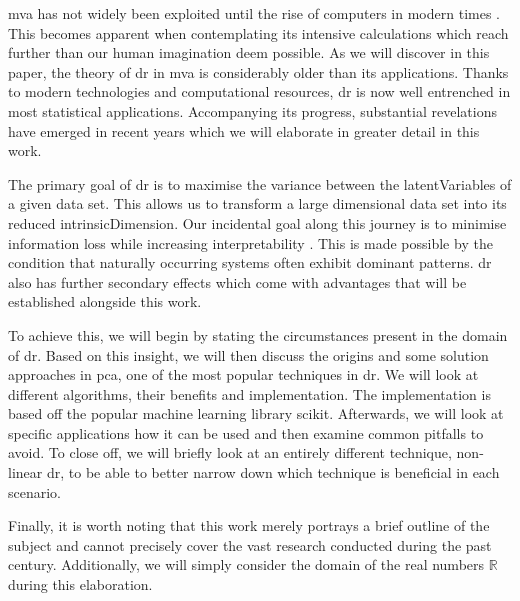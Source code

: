 \Gls{mva} has not widely been exploited until the rise of computers in modern times \cite{Jolliffe2002book}.
This becomes apparent when contemplating its intensive calculations which reach further than our human imagination deem possible.
As we will discover in this paper, the theory of \gls{dr} in \gls{mva} is considerably older than its applications.
Thanks to modern technologies and computational resources, \gls{dr} is now well entrenched in most statistical applications.
Accompanying its progress, substantial revelations have emerged in recent years which we will elaborate in greater detail in this work.
\bigskip


The primary goal of \gls{dr} is to maximise the variance between the \glspl{latentVariable} of a given data set.
This allows us to transform a large dimensional data set into its reduced \gls{intrinsicDimension}.
Our incidental goal along this journey is to minimise information loss while increasing interpretability \cite{jolliffe2016principal}.
This is made possible by the condition that naturally occurring systems often exhibit dominant patterns.
\Gls{dr} also has further secondary effects which come with advantages that will be established alongside this work.
\medskip

To achieve this, we will begin by stating the circumstances present in the domain of \gls{dr}.
Based on this insight, we will then discuss the origins and some solution approaches in \gls{pca}, one of the most popular techniques in \gls{dr}.
We will look at different algorithms, their benefits and implementation.
The implementation is based off the popular machine learning library \gls{scikit}.
Afterwards, we will look at specific applications how it can be used and then examine common pitfalls to avoid.
To close off, we will briefly look at an entirely different technique, non-linear \gls{dr}, to be able to better narrow down which technique is beneficial in each scenario.
\bigskip


Finally, it is worth noting that this work merely portrays a brief outline of the subject and cannot precisely cover the vast research conducted during the past century.
Additionally, we will simply consider the domain of the real numbers $\mathbb{R}$ during this elaboration.


